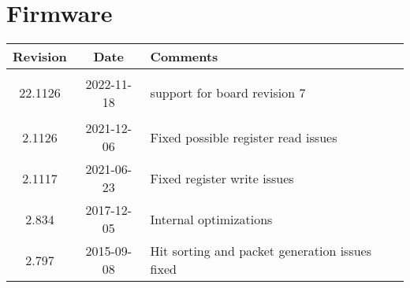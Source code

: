 \section{Firmware}
\begin{tabularx}{\textwidth}{|c|c|X|}
    \hline
    Revision & Date & Comments\\
    \hline\hline
    \hypertarget{fwrev}{22.1126} & 2022-11-18 & support for board revision 7\\
	\hline
    2.1126 & 2021-12-06 & Fixed possible register read issues\\
	\hline
	2.1117 & 2021-06-23 & Fixed register write issues\\
	\hline
	2.834 & 2017-12-05 & Internal optimizations\\
    \hline
    2.797 & 2015-09-08 & Hit sorting and packet generation issues fixed\\
    \hline
\end{tabularx}